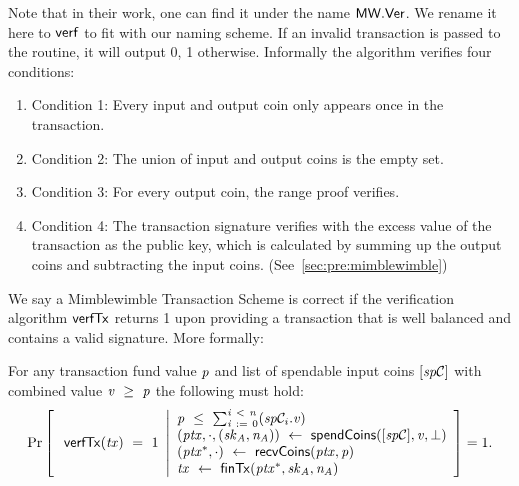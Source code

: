 \begin{definition}
\begin{itemize}
        Note that in their work, one can find it under the name $\mathsf{MW.Ver}$.
        We rename it here to $\mathsf{verf}$ to fit with our naming scheme.
        If an invalid transaction is passed to the routine, it will output 0, 1 otherwise.
        Informally the algorithm verifies four conditions:
        \begin{enumerate}
            \item Condition 1: Every input and output coin only appears once in the transaction.
            \item Condition 2: The union of input and output coins is the empty set.
            \item Condition 3: For every output coin, the range proof verifies.
            \item Condition 4: The transaction signature verifies with the excess value of the transaction as the public key, which is calculated by summing up the output coins and subtracting the input coins. (See~\cref{sec:pre:mimblewimble})
        \end{enumerate}
    \end{itemize}
\end{definition}

We say a Mimblewimble Transaction Scheme is correct if the verification algorithm $\mathsf{verfTx}$ returns 1 upon providing a transaction that is well balanced and contains a valid signature.
More formally:
\begin{definition}
    \label{def:atom:tx-scheme-correctness}
    For any transaction fund value $\mathit{p}$ and list of spendable input coins $[\mathit{sp}\mathcal{C}]$ with combined value $\mathit{v} ~\geq~ \mathit{p}$ the following must hold:
    \[
        \Pr\left[
        \begin{array}{c}
            \: \mathsf{verfTx}(\mathit{tx}) ~=~ 1
        \end{array}
        \middle\vert
        \begin{array}{l}
            \mathit{p} ~\leq~ \sum_{\mathit{i} ~:=~ 0}^{\mathit{i} ~<~ \mathit{n}}(\mathit{sp}\mathcal{C}_{i}.\mathit{v}) \\
            (\mathit{ptx}, \cdot, (\mathit{sk}_{\mathit{A}}, \mathit{\mathit{n}_{\mathit{A}}})) ~\leftarrow~ \mathsf{spendCoins}([\mathit{sp}\mathcal{C}],\mathit{v},\bot) \\
            (\mathit{ptx}^*, \cdot) ~\leftarrow~ \mathsf{recvCoins}(\mathit{ptx},\mathit{p}) \\
            \mathit{tx} ~\leftarrow~ \mathsf{finTx}(\mathit{ptx}^*,\mathit{sk}_{\mathit{A}},\mathit{\mathit{n}_{\mathit{A}}})
        \end{array}
        \right]=1.
    \]
\end{definition}


